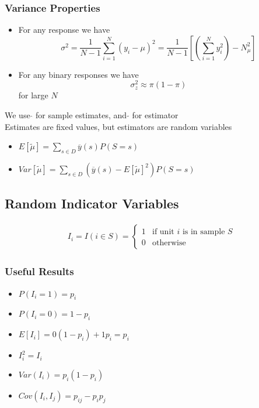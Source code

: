 \documentclass[11pt]{article}
\begin{document}
\subsubsection{Variance Properties}
\begin{itemize}
    \item For any response we have \[\sigma^2=\frac{1}{N-1}\sum_{i=1}^{N}(y_i-\mu)^2=\frac{1}{N-1}[(\sum_{i=1}^{N}y_i^2) - N_\mu^2]\]
    \item For any binary responses we have \[\sigma_z^2\approx\pi(1-\pi)\] for large $N$
\end{itemize}
We use $\hat{}$ for sample estimates, and $\tilde{}$ for estimator \\
Estimates are fixed values, but estimators are random variables 
\begin{itemize}
    \item $E[\tilde{\mu}]=\sum_{s\in D}\overline{y}(s)P(S=s)$
    \item $Var[\tilde{\mu}] = \sum_{s\in D}(\overline{y}(s)-E[\tilde{\mu}]^2)P(S=s)$
\end{itemize}
\subsection{Random Indicator Variables}
\begin{align*}
    I_i=I(i\in S)=
    \begin{cases}
        1 &\text{if unit $i$ is in sample $S$} \\
        0 &\text{otherwise}
    \end{cases}
\end{align*}
\subsubsection{Useful Results}
\begin{itemize}
    \item $P(I_i=1)=p_i$
    \item $P(I_i=0)=1-p_i$
    \item $E[I_i]=0(1-p_i)+1p_i=p_i$
    \item $I_i^2=I_i$
    \item $Var(I_i)=p_i(1-p_i)$
    \item $Cov(I_i,I_j)=p_{ij}-p_ip_j$
\end{itemize}
\end{document}
